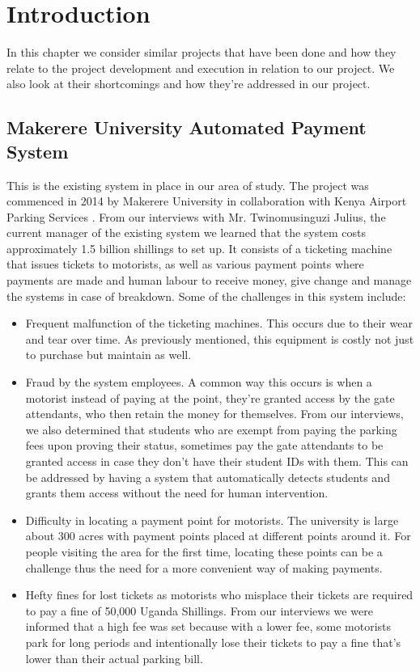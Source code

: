 \section{Introduction}
In this chapter we consider similar projects that have been done and how they relate to the project development and execution in relation to our project. We also look at their shortcomings and how they're addressed in our project.

\subsection{Makerere University Automated Payment System}
This is the existing system in place in our area of study. The project was commenced in 2014 by Makerere University in collaboration with Kenya Airport Parking Services\cite{wamai_mak_2014} . From our interviews with Mr. Twinomusinguzi Julius, the current manager of the existing system we learned that the system costs approximately 1.5 billion shillings to set up. It consists of a ticketing machine that issues tickets to motorists, as well as various payment points where payments are made and human labour to receive money, give change and manage the systems in case of breakdown. Some of the challenges in this system include:
\begin{itemize}
    \item Frequent malfunction of the ticketing machines. This occurs due to their wear and tear over time. As previously mentioned, this equipment is costly not just to purchase but maintain as well.
    \item Fraud by the system employees. A common way this occurs is when a motorist instead of paying at the point, they're granted access by the gate attendants, who then retain the money for themselves. From our interviews, we also determined that students who are exempt from paying the parking fees upon proving their status, sometimes pay the gate attendants to be granted access in case they don't have their student IDs with them. This can be addressed by having a system that automatically detects students and grants them access without the need for human intervention.
    \item Difficulty in locating a payment point for motorists. The university is large about 300 acres with payment points placed at different points around it. For people visiting the area for the first time, locating these points can be a challenge thus the need for a more convenient way of making payments.
    \item Hefty fines for lost tickets as motorists who misplace their tickets are required to pay a fine of 50,000 Uganda Shillings. From our interviews we were informed that a high fee was set because with a lower fee, some motorists park for long periods and intentionally lose their tickets to pay a fine that's lower than their actual parking bill.
\end{itemize}


